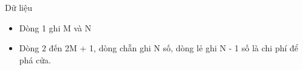 Dữ liệu
\begin{itemize}
	\item Dòng 1 ghi M và N
	\item Dòng 2 đến 2M + 1, dòng chẵn ghi N số, dòng lẻ ghi N - 1 số là chi phí để phá cửa.
\end{itemize}